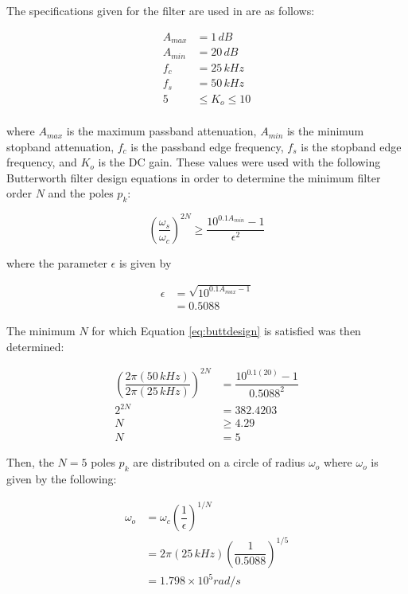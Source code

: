 
The specifications given for the filter are used in are as follows:

\begin{align*}
A_{max} &= 1 \, dB\\
A_{min} &= 20 \, dB\\
f_c &= 25 \, kHz\\
f_s &= 50 \, kHz\\
5 &\le K_o \le 10\\
\end{align*}

where $A_{max}$ is the maximum passband attenuation, $A_{min}$ is the minimum stopband attenuation, $f_c$ is the passband edge frequency, $f_s$ is the stopband edge frequency, and $K_o$ is the DC gain. These values were used with the following Butterworth filter design equations in order to determine the minimum filter order $N$ and the poles $p_k$\cite{fdesign}:

\begin{equation}\label{eq:buttdesign}
\left( \dfrac{\omega_s}{\omega_c} \right)^{2N} \ge \dfrac{10^{0.1A_{min}} - 1}{\epsilon^2}
\end{equation}

where the parameter $\epsilon$ is given by

\begin{align*}
\epsilon &= \sqrt{10^{0.1A_{max}-1}}\\
&= 0.5088
\end{align*}

The minimum $N$ for which Equation \ref{eq:buttdesign} is satisfied was then determined:

\begin{align*}
\left( \dfrac{2\pi(50\,kHz)}{2\pi(25\,kHz)} \right)^{2N} &= \dfrac{10^{0.1(20)} - 1}{0.5088^2}\\
2^{2N} &= 382.4203 \\
N &\ge 4.29 \\
N &= 5
\end{align*}

Then, the $N=5$ poles $p_k$ are distributed on a circle of radius $\omega_o$ where $\omega_o$ is given by the following:

\begin{align*}
\omega_o &= \omega_c \left( \dfrac{1}{\epsilon}  \right) ^{1/N}\\
&= 2\pi(25\,kHz) \left( \dfrac{1}{0.5088}  \right) ^{1/5}\\
&= 1.798 \times 10^5 rad/s
\end{align*}

